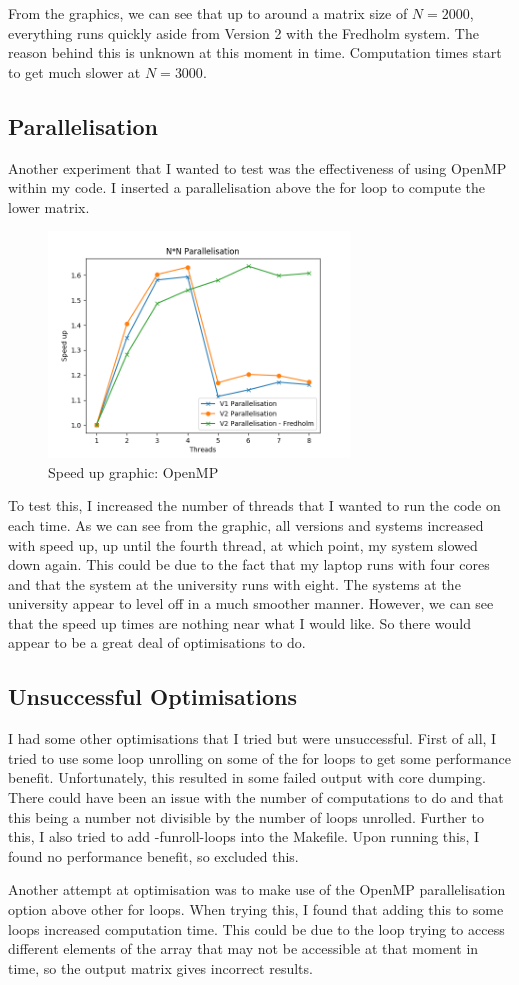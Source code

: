 From the graphics, we can see that up to around a matrix size of $N = 2000$, everything runs quickly aside from Version 2 with the Fredholm system. The reason behind this is unknown at this moment in time. Computation times start to get much slower at $N = 3000$.
\subsection{Parallelisation}
Another experiment that I wanted to test was the effectiveness of using OpenMP within my code. I inserted a parallelisation above the for loop to compute the lower matrix.

\begin{figure}[htb]
    \begin{center}
        \includegraphics[width=8cm]{../images/NN_speedup.png}
        \caption{Speed up graphic: OpenMP}
    \end{center}
\end{figure}

To test this, I increased the number of threads that I wanted to run the code on each time. As we can see from the graphic, all versions and systems increased with speed up, up until the fourth thread, at which point, my system slowed down again. This could be due to the fact that my laptop runs with four cores and that the system at the university runs with eight. The systems at the university appear to level off in a much smoother manner. However, we can see that the speed up times are nothing near what I would like. So there would appear to be a great deal of optimisations to do.
\subsection{Unsuccessful Optimisations}
I had some other optimisations that I tried but were unsuccessful. First of all, I tried to use some loop unrolling on some of the for loops to get some performance benefit. Unfortunately, this resulted in some failed output with core dumping. There could have been an issue with the number of computations to do and that this being a number not divisible by the number of loops unrolled. Further to this, I also tried to add -funroll-loops into the Makefile. Upon running this, I found no performance benefit, so excluded this.

Another attempt at optimisation was to make use of the OpenMP parallelisation option above other for loops. When trying this, I found that adding this to some loops increased computation time. This could be due to the loop trying to access different elements of the array that may not be accessible at that moment in time, so the output matrix gives incorrect results.

